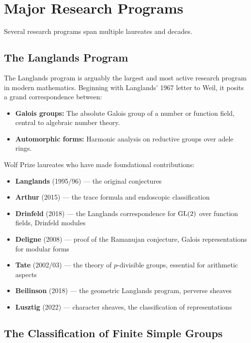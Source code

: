\section{Major Research Programs}

Several research programs span multiple laureates and decades.

\subsection{The Langlands Program}

The Langlands program is arguably the largest and most active research program in modern mathematics. Beginning with Langlands' 1967 letter to Weil, it posits a grand correspondence between:
\begin{itemize}
    \item \textbf{Galois groups:} The absolute Galois group of a number or function field, central to algebraic number theory.
    \item \textbf{Automorphic forms:} Harmonic analysis on reductive groups over adele rings.
\end{itemize}

Wolf Prize laureates who have made foundational contributions:
\begin{itemize}
    \item \textbf{Langlands} (1995/96) --- the original conjectures
    \item \textbf{Arthur} (2015) --- the trace formula and endoscopic classification
    \item \textbf{Drinfeld} (2018) --- the Langlands correspondence for $\operatorname{GL}(2)$ over function fields, Drinfeld modules
    \item \textbf{Deligne} (2008) --- proof of the Ramanujan conjecture, Galois representations for modular forms
    \item \textbf{Tate} (2002/03) --- the theory of $p$-divisible groups, essential for arithmetic aspects
    \item \textbf{Beilinson} (2018) --- the geometric Langlands program, perverse sheaves
    \item \textbf{Lusztig} (2022) --- character sheaves, the classification of representations
\end{itemize}

\subsection{The Classification of Finite Simple Groups}

